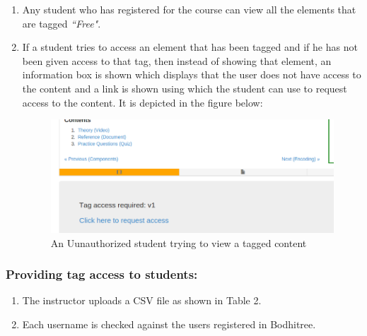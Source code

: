\begin{enumerate}
	\item Any student who has registered for the course can view all the elements that are tagged \textit{``Free"}.
	
	\item If a student tries to access an element that has been tagged and if he has not been given access to that tag, then instead of showing that element, an information box is shown which displays that the user does not have access to the content and a link is shown using which the student can use to request access to the content. It is depicted in the figure below:
	\begin{figure}[h]
		\centering
		\includegraphics[width=0.8\linewidth]{./media/sAccessNot}
		\caption{An Uunauthorized student trying to view a tagged content}
		\label{fig:sAccessNot}
	\end{figure}

\end{enumerate}

\subsubsection*{Providing tag access to students:}

\begin{enumerate}
	\item The instructor uploads a CSV file as shown in Table 2.
	\item Each username is checked against the users registered in Bodhitree.
\end{enumerate}

